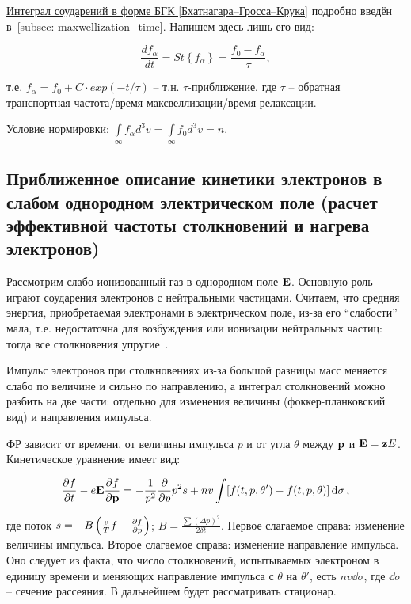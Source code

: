 \documentclass[10pt, a4paper]{article}
\begin{document}
\uline{Интеграл соударений в форме БГК [Бхатнагара–Гросса–Крука]} подробно введён в~\ref{subsec: maxwellization_time}. Напишем здесь лишь его вид:

\begin{equation} \label{eq:BGK_collision_term}
	\frac{df_\alpha}{dt} = St\left\lbrace f_\alpha\right\rbrace = \frac{f_0-f_\alpha}{\tau},
\end{equation}

т.е. $f_\alpha = f_0 + C\cdot exp(-t/\tau)$ -- т.н. $\tau$-приближение, где $\tau$ -- обратная транспортная частота/время максвеллизации/время релаксации.

Условие нормировки: $\int\limits_{\infty}f_\alpha d^3v =\int\limits_{\infty}f_0d^3v = n$.

\subsection{Приближенное описание кинетики электронов в слабом однородном электрическом поле (расчет эффективной частоты столкновений и нагрева электронов)}

Рассмотрим слабо ионизованный газ в однородном поле $\vb{E}$. Основную роль играют соударения электронов с нейтральными частицами. Считаем, что средняя энергия, приобретаемая электронами в электрическом поле, из-за его ``слабости'' мала, т.е. недостаточна для возбуждения или ионизации нейтральных частиц: тогда все столкновения упругие~\cite{landau10}.

Импульс электронов при столкновениях из-за большой разницы масс меняется слабо по величине и сильно по направлению, а интеграл столкновений можно разбить на две части: отдельно для изменения величины (фоккер-планковский вид) и направления импульса.

ФР зависит от времени, от величины импульса $p$ и от угла $\theta$ между $\vb{p}$ и $\vb{E} = \vb{z}E$. Кинетическое уравнение имеет вид:

\begin{equation*}
	\pdv{f}{t}-e\vb{E}\pdv{f}{\vb{p}} = -\frac{1}{p^2}\pdv{}{p}p^2s + nv\int[f(t, p, \theta')-f(t, p, \theta)]\dd{\sigma},
\end{equation*}

где поток $s = -B\left(\frac{v}{T}f+\pdv{f}{p}\right)$; $B = \frac{\sum(\Delta p)^2}{2\delta t}$. Первое слагаемое справа: изменение величины импульса. Второе слагаемое справа: изменение направление импульса. Оно следует из факта, что число столкновений, испытываемых электроном в единицу времени и меняющих направление импульса с $\theta$ на $\theta'$, есть $nv\dd{\sigma}$, где $\dd{\sigma}$ -- сечение рассеяния. В дальнейшем будет рассматривать стационар.
\end{document}
